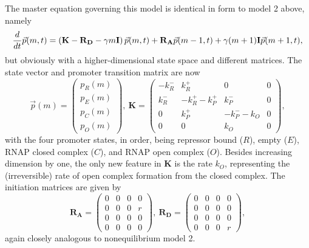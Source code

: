 The master equation governing this model is identical in form to model 2 above,
namely
\begin{equation}
\frac{d {}}{d t}\vec{p}(m,t) =
\left( \mathbf{K} - \mathbf{R_D} - \gamma m \mathbf{I} \right) \vec{p}(m,t)
                + \mathbf{R_A} \vec{p}(m-1,t) +
                \gamma (m+1) \mathbf{I} \vec{p}(m+1,t),
\end{equation}
but obviously with a higher-dimensional state space and different matrices. The
state vector and promoter transition matrix are now
\begin{equation}
\vec{p}(m) = \begin{pmatrix} p_R(m) \\ p_E(m) \\
                             p_C(m) \\ p_O(m)\end{pmatrix},\
\mathbf{K} = \begin{pmatrix} -k_R^- & k_R^+ & 0 & 0\\
                        k_R^- & -k_R^+ -k_P^+ & k_P^- & 0 \\
                        0 & k_P^+ & -k_P^- - k_O & 0 \\
                        0 & 0 & k_O & 0
                \end{pmatrix},
\end{equation}
with the four promoter states, in order, being repressor bound ($R$), empty
($E$), RNAP closed complex ($C$), and RNAP open complex ($O$). Besides
increasing dimension by one, the only new feature in $\mathbf{K}$ is the
rate $k_O$, representing the (irreversible) rate of open complex formation from
the closed complex. The initiation matrices are given by
\begin{equation}
\mathbf{R_A} = \begin{pmatrix}
        0 & 0 & 0 & 0 \\ 
        0 & 0 & 0 & r \\ 
        0 & 0 & 0 & 0 \\ 
        0 & 0 & 0 & 0
                \end{pmatrix},\
\mathbf{R_D} = \begin{pmatrix}
        0 & 0 & 0 & 0 \\ 
        0 & 0 & 0 & 0 \\ 
        0 & 0 & 0 & 0 \\ 
        0 & 0 & 0 & r
                \end{pmatrix},
\end{equation}
again closely analogous to nonequilibrium model 2.

